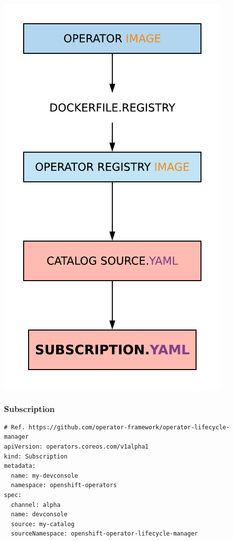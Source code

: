 \documentclass[aspectratio=169]{beamer}
\begin{document}
\begin{frame}
  \begin{center}
    \includegraphics[scale=.50]{images/subscription2.png}
  \end{center}
\end{frame}

\begin{frame}[fragile]
  \frametitle{Subscription}

  \begin{Verbatim}[fontsize=\small]
# Ref. https://github.com/operator-framework/operator-lifecycle-manager
apiVersion: operators.coreos.com/v1alpha1
kind: Subscription
metadata:
  name: my-devconsole
  namespace: openshift-operators
spec:
  channel: alpha
  name: devconsole
  source: my-catalog
  sourceNamespace: openshift-operator-lifecycle-manager
  \end{Verbatim}
\end{frame}
\end{document}
